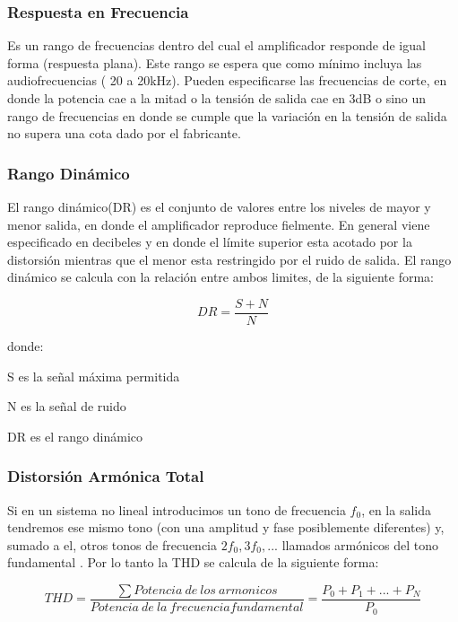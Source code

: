 \subsubsection*{Respuesta en Frecuencia}

Es un rango de frecuencias dentro del cual el amplificador responde de igual forma (respuesta plana). Este rango se espera que como mínimo incluya las audiofrecuencias ( 20 a 20kHz).
Pueden especificarse las frecuencias de corte, en donde la potencia cae a la mitad o la tensión de salida cae en 3dB o sino un rango de frecuencias en donde se cumple que la variación en la tensión de salida no supera una cota dado por el fabricante.
\medskip 
\subsubsection*{Rango Dinámico}

El rango dinámico(DR) es el conjunto de valores entre los niveles de mayor y menor salida, en donde el amplificador reproduce fielmente. En general viene especificado en decibeles y en donde el límite superior esta acotado por la distorsión mientras que el menor esta restringido por el ruido de salida. El rango dinámico se calcula con la relación entre ambos limites, de la siguiente forma:

\begin{equation}\label{rango_dinamico_eq}
DR= \frac{S+N}{N}
\end{equation}

donde:
\begin{description}
\item S es la señal máxima permitida
\item N es la señal de ruido
\item DR es el rango dinámico
\end{description}
\medskip 
\subsubsection*{Distorsión Armónica Total}

Si en un sistema no lineal introducimos un tono de frecuencia $f_0$, en la salida tendremos ese mismo tono (con una amplitud y fase posiblemente diferentes) y, sumado a el, otros tonos de frecuencia $2f_0, 3f_0, ...$ llamados armónicos del tono fundamental . Por lo tanto la THD se calcula de la siguiente forma:

\begin{equation}\label{THD_eq}
THD= \frac{\sum Potencia~de ~los ~armonicos}{Potencia~ de ~la ~frecuencia fundamental}=\frac{P_0+P_1+...+P_N}{P_0}
\end{equation}

